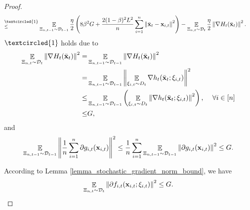 \documentclass{article}
\begin{document}
\begin{proof}
\begin{align}
\refabovecir{\le}{\textcircled{1}} & \EE_{ \Xi_{n,t-1} \sim \Dcal_{t-1} } \frac{\eta}{2}\lrincir{ 8\beta^2 G + \frac{2(1-\beta)^2L^2}{n}\sum_{i=1}^n \lrnorm{ \bar{\x}_t - \x_{i,t} }^2 }  - \EE_{ \Xi_{n,t} \sim \Dcal_{t} } \frac{\eta}{2} \lrnorm{\nabla H_t(\bar{\x}_t)}^2.
\end{align} $\textcircled{1}$ holds due to 
\begin{align}
\nonumber
\mathop{\mathbb{E}}_{ \Xi_{n,t} \sim \mathcal{D}_{t} } \left\lVert\nabla H_t(\bar{{\bf x}}_t)\right\rVert^2 =  & \mathop{\mathbb{E}}_{ \Xi_{n,t-1} \sim \mathcal{D}_{t-1} } \left\lVert\nabla H_t(\bar{{\bf x}}_t)\right\rVert^2 \\ \nonumber
= & \mathop{\mathbb{E}}_{ \Xi_{n,t-1} \sim \mathcal{D}_{t-1} } \left\lVert\mathop{\mathbb{E}}_{\xi_{i,t}\sim D_t} \nabla h_t(\bar{{\bf x}}_t;\xi_{i,t})\right\rVert^2 \\ \nonumber
\le & \mathop{\mathbb{E}}_{ \Xi_{n,t-1} \sim \mathcal{D}_{t-1} } \left( \mathop{\mathbb{E}}_{\xi_{i,t}\sim D_t}\left\lVert\nabla h_t(\bar{{\bf x}}_t;\xi_{i,t})\right\rVert^2 \right) \text{,~~~~} \forall i\in[n]\\ \nonumber
\le & G,
\end{align} and 
\begin{align}
\nonumber
\mathop{\mathbb{E}}_{ \Xi_{n,t-1} \sim \mathcal{D}_{t-1} }\left\lVert\frac{1}{n}\sum_{i=1}^n \partial g_{i,t}({\bf x}_{i,t})\right\rVert^2 \le \frac{1}{n}\sum_{i=1}^n  \mathop{\mathbb{E}}_{ \Xi_{n,t-1} \sim \mathcal{D}_{t-1} }\left\lVert\partial g_{i,t}({\bf x}_{i,t})\right\rVert^2 \le G.
\end{align}




According to Lemma \ref{lemma_stochastic_gradient_norm_bound}, we have
\begin{align}
\label{equa_lemma_gradient_norm_temp2}
\mathop{\mathbb{E}}_{ \Xi_{n,t} \sim \mathcal{D}_{t} }\left\lVert \partial f_{i,t}({\bf x}_{i,t};\xi_{i,t})\right\rVert^2 \le G.
\end{align}


\end{proof}
\end{document}
